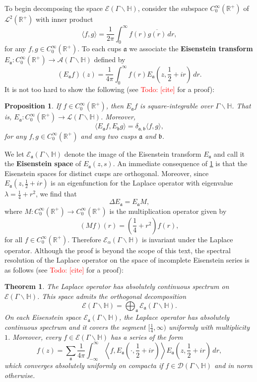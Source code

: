 \documentclass[12pt]{book}
\newtheorem{theorem}{Theorem}[section]
\newtheorem{proposition}{Proposition}[section]
\theoremstyle{definition}\newframedtheorem{method}{Method}
\newcommand{\mf}{\mathfrak}
\newcommand{\mc}{\mathcal}
\newcommand{\R}{\mathbb{R}}
\renewcommand{\H}{\mathbb{H}}
\renewcommand{\a}{\alpha}
\renewcommand{\d}{\delta}
\renewcommand{\l}{\lambda}
\newcommand{\G}{\Gamma}
\newcommand{\D}{\Delta}
\newcommand{\bigop}{\bigoplus}
\newcommand{\<}{\langle}
\renewcommand{\>}{\rangle}
\newcommand{\conj}{\overline}
\newcommand{\GH}{\G\backslash\H}
\newcommand{\todo}[1]{\textcolor{red}{\sf Todo: [#1]}}
\begin{document}
      To begin decomposing the space $\mc{E}(\GH)$, consider the subspace $C_{0}^{\infty}(\R^{+})$ of $\mc{L}^{2}(\R^{+})$ with inner product
      \[
        \<f,g\> = \frac{1}{2\pi}\int_{0}^{\infty}f(r)\conj{g(r)}\,dr,
      \]
      for any $f,g \in C_{0}^{\infty}(\R^{+})$. To each cups $\mf{a}$ we associate the \textbf{Eisenstein transform} $E_{\mf{a}}:C_{0}^{\infty}(\R^{+}) \to \mc{A}(\GH)$ defined by
      \[
        (E_{\mf{a}}f)(z) = \frac{1}{4\pi}\int_{0}^{\infty}f(r)E_{\mf{a}}\left(z,\frac{1}{2}+ir\right)\,dr.
      \]
      It is not too hard to show the following (see \todo{cite} for a proof):

      \begin{proposition}\label{prop:Eisenstein_transform_property}
        If $f \in C_{0}^{\infty}(\R^{+})$, then $E_{\mf{a}}f$ is square-integrable over $\GH$. That is, $E_{\mf{a}}:C_{0}^{\infty}(\R^{+}) \to \mc{L}(\GH)$. Moreover,
        \[
          \<E_{\mf{a}}f,E_{\mf{b}}g\> = \d_{\mf{a},\mf{b}}\<f,g\>,
        \]
        for any $f,g \in C_{0}^{\infty}(\R^{+})$ and any two cusps $\mf{a}$ and $\mf{b}$.
      \end{proposition}

      We let $\mc{E}_{\mf{a}}(\GH)$ denote the image of the Eisenstein transform $E_{\mf{a}}$ and call it the \textbf{Eisenstein space} of $E_{\mf{a}}(z,s)$. An immediate consequence of \cref{prop:Eisenstein_transform_property} is that the Eisenstein spaces for distinct cusps are orthogonal. Moreover, since $E_{\mf{a}}\left(z,\frac{1}{2}+ir\right)$ is an eigenfunction for the Laplace operator with eigenvalue $\l = \frac{1}{4}+r^{2}$, we find that
      \[
        \D E_{\mf{a}}= E_{\mf{a}}M,
      \]
      where $M:C_{0}^{\infty}(\R^{+}) \to C_{0}^{\infty}(\R^{+})$ is the multiplication operator given by
      \[
        (Mf)(r) = \left(\frac{1}{4}+r^{2}\right)f(r),
      \]
      for all $f \in C_{0}^{\infty}(\R^{+})$. Therefore $\mc{E}_{\a}(\GH)$ is invariant under the Laplace operator. Although the proof is beyond the scope of this text, the spectral resolution of the Laplace operator on the space of incomplete Eisenstein series is as follows (see \todo{cite} for a proof):

      \begin{theorem}\label{thm:incomplete_Eisenstein_series_spectrum}
        The Laplace operator has absolutely continuous spectrum on $\mc{E}(\GH)$. This space admits the orthogonal decomposition
        \[
          \mc{E}(\GH) = \bigop_{\mf{a}}\mc{E}_{\mf{a}}(\GH).
        \]
        On each Eisenstein space $\mc{E}_{\mf{a}}(\GH)$, the Laplace operator has absolutely continuous spectrum and it covers the segment $[\frac{1}{4},\infty)$ uniformly with multiplicity $1$. Moreover, every $f \in \mc{E}(\GH)$ has a series of the form
        \[
          f(z) = \sum_{\mf{a}}\frac{1}{4\pi}\int_{-\infty}^{\infty}\left\<f,E_{\mf{a}}\left(\cdot,\frac{1}{2}+ir\right)\right\>E_{\mf{a}}\left(z,\frac{1}{2}+ir\right)\,dr,
        \]
        which converges absolutely uniformly on compacta if $f \in \mc{D}(\GH)$ and in norm otherwise.
      \end{theorem}
\end{document}
